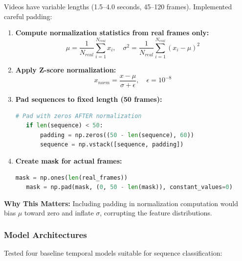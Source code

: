 \documentclass[11pt,a4paper]{article}
\begin{document}
Videos have variable lengths (1.5--4.0 seconds, 45--120 frames). Implemented careful padding:

\begin{enumerate}
\item \textbf{Compute normalization statistics from real frames only:}
   \begin{equation}
   \mu = \frac{1}{N_{real}} \sum_{i=1}^{N_{real}} x_i, \quad \sigma^2 = \frac{1}{N_{real}} \sum_{i=1}^{N_{real}} (x_i - \mu)^2
   \end{equation}

\item \textbf{Apply Z-score normalization:}
   \begin{equation}
   x_{norm} = \frac{x - \mu}{\sigma + \epsilon}, \quad \epsilon = 10^{-8}
   \end{equation}

\item \textbf{Pad sequences to fixed length (50 frames):}
   \begin{lstlisting}[language=Python]
   # Pad with zeros AFTER normalization
   if len(sequence) < 50:
       padding = np.zeros((50 - len(sequence), 60))
       sequence = np.vstack([sequence, padding])
   \end{lstlisting}

\item \textbf{Create mask for actual frames:}
   \begin{lstlisting}[language=Python]
   mask = np.ones(len(real_frames))
   mask = np.pad(mask, (0, 50 - len(mask)), constant_values=0)
   \end{lstlisting}
\end{enumerate}

\textbf{Why This Matters:} Including padding in normalization computation would bias $\mu$ toward zero and inflate $\sigma$, corrupting the feature distributions.

\subsubsection{Model Architectures}

Tested four baseline temporal models suitable for sequence classification:
\end{document}
